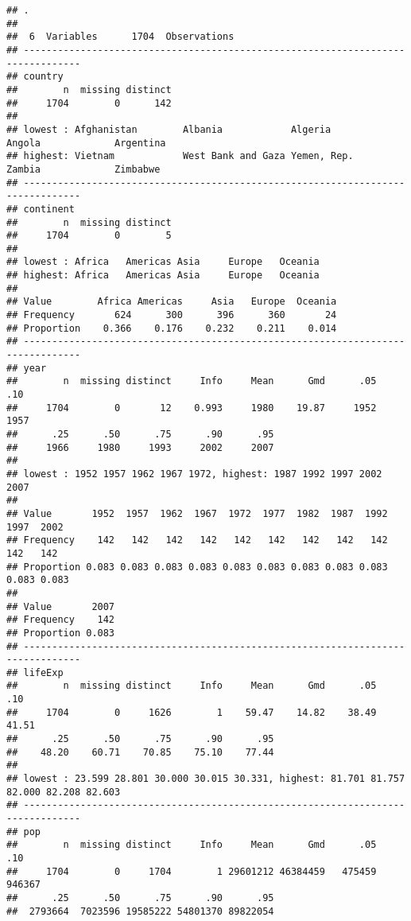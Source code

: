 \documentclass[]{book}
\begin{document}
\begin{verbatim}
## . 
## 
##  6  Variables      1704  Observations
## --------------------------------------------------------------------------------
## country 
##        n  missing distinct 
##     1704        0      142 
## 
## lowest : Afghanistan        Albania            Algeria            Angola             Argentina         
## highest: Vietnam            West Bank and Gaza Yemen, Rep.        Zambia             Zimbabwe          
## --------------------------------------------------------------------------------
## continent 
##        n  missing distinct 
##     1704        0        5 
## 
## lowest : Africa   Americas Asia     Europe   Oceania 
## highest: Africa   Americas Asia     Europe   Oceania 
##                                                        
## Value        Africa Americas     Asia   Europe  Oceania
## Frequency       624      300      396      360       24
## Proportion    0.366    0.176    0.232    0.211    0.014
## --------------------------------------------------------------------------------
## year 
##        n  missing distinct     Info     Mean      Gmd      .05      .10 
##     1704        0       12    0.993     1980    19.87     1952     1957 
##      .25      .50      .75      .90      .95 
##     1966     1980     1993     2002     2007 
## 
## lowest : 1952 1957 1962 1967 1972, highest: 1987 1992 1997 2002 2007
##                                                                             
## Value       1952  1957  1962  1967  1972  1977  1982  1987  1992  1997  2002
## Frequency    142   142   142   142   142   142   142   142   142   142   142
## Proportion 0.083 0.083 0.083 0.083 0.083 0.083 0.083 0.083 0.083 0.083 0.083
##                 
## Value       2007
## Frequency    142
## Proportion 0.083
## --------------------------------------------------------------------------------
## lifeExp 
##        n  missing distinct     Info     Mean      Gmd      .05      .10 
##     1704        0     1626        1    59.47    14.82    38.49    41.51 
##      .25      .50      .75      .90      .95 
##    48.20    60.71    70.85    75.10    77.44 
## 
## lowest : 23.599 28.801 30.000 30.015 30.331, highest: 81.701 81.757 82.000 82.208 82.603
## --------------------------------------------------------------------------------
## pop 
##        n  missing distinct     Info     Mean      Gmd      .05      .10 
##     1704        0     1704        1 29601212 46384459   475459   946367 
##      .25      .50      .75      .90      .95 
##  2793664  7023596 19585222 54801370 89822054 

\end{verbatim}
\end{document}
